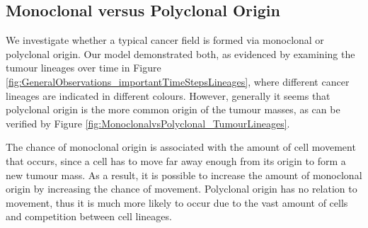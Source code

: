 \documentclass[\main/thesis.tex]{subfiles}
\begin{document}
\subsection{Monoclonal versus Polyclonal Origin}
We investigate whether a typical cancer field is formed via monoclonal or polyclonal origin. Our model demonstrated both, as evidenced by examining the tumour lineages over time in Figure \ref{fig:GeneralObservations_importantTimeStepsLineages}, where different cancer lineages are indicated in different colours. However, generally it seems that polyclonal origin is the more common origin of the tumour masses, as can be verified by Figure \ref{fig:MonoclonalvsPolyclonal_TumourLineages}.

The chance of monoclonal origin is associated with the amount of cell movement that occurs, since a cell has to move far away enough from its origin to form a new tumour mass. As a result, it is possible to increase the amount of monoclonal origin by increasing the chance of movement. Polyclonal origin has no relation to movement, thus it is much more likely to occur due to the vast amount of cells and competition between cell lineages. 
\end{document}
